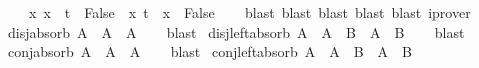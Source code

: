 \begin{isabellebody}
\ \ \ \ {\isachardoublequoteopen}{\isacharparenleft}{\kern0pt}{\isasymforall}x{\isachardot}{\kern0pt}\ x\ {\isasymnoteq}\ t{\isacharparenright}{\kern0pt}\ {\isacharequal}{\kern0pt}\ False{\isachardoublequoteclose}\ \ {\isachardoublequoteopen}{\isacharparenleft}{\kern0pt}{\isasymforall}x{\isachardot}{\kern0pt}\ t\ {\isasymnoteq}\ x{\isacharparenright}{\kern0pt}\ {\isacharequal}{\kern0pt}\ False{\isachardoublequoteclose}\isanewline
%
\isadelimproof
\ \ %
\endisadelimproof
%
\isatagproof
{}\isamarkupfalse%
\ {\isacharparenleft}{\kern0pt}blast{\isacharcomma}{\kern0pt}\ blast{\isacharcomma}{\kern0pt}\ blast{\isacharcomma}{\kern0pt}\ blast{\isacharcomma}{\kern0pt}\ blast{\isacharcomma}{\kern0pt}\ iprover{\isacharplus}{\kern0pt}{\isacharparenright}{\kern0pt}%
\endisatagproof
{\isafoldproof}%
%
\isadelimproof
\isanewline
%
\endisadelimproof
\isanewline
{}\isamarkupfalse%
\ disj{\isacharunderscore}{\kern0pt}absorb{\isacharcolon}{\kern0pt}\ {\isachardoublequoteopen}A\ {\isasymor}\ A\ {\isasymlongleftrightarrow}\ A{\isachardoublequoteclose}\isanewline
%
\isadelimproof
\ \ %
\endisadelimproof
%
\isatagproof
{}\isamarkupfalse%
\ blast%
\endisatagproof
{\isafoldproof}%
%
\isadelimproof
\isanewline
%
\endisadelimproof
\isanewline
{}\isamarkupfalse%
\ disj{\isacharunderscore}{\kern0pt}left{\isacharunderscore}{\kern0pt}absorb{\isacharcolon}{\kern0pt}\ {\isachardoublequoteopen}A\ {\isasymor}\ {\isacharparenleft}{\kern0pt}A\ {\isasymor}\ B{\isacharparenright}{\kern0pt}\ {\isasymlongleftrightarrow}\ A\ {\isasymor}\ B{\isachardoublequoteclose}\isanewline
%
\isadelimproof
\ \ %
\endisadelimproof
%
\isatagproof
{}\isamarkupfalse%
\ blast%
\endisatagproof
{\isafoldproof}%
%
\isadelimproof
\isanewline
%
\endisadelimproof
\isanewline
{}\isamarkupfalse%
\ conj{\isacharunderscore}{\kern0pt}absorb{\isacharcolon}{\kern0pt}\ {\isachardoublequoteopen}A\ {\isasymand}\ A\ {\isasymlongleftrightarrow}\ A{\isachardoublequoteclose}\isanewline
%
\isadelimproof
\ \ %
\endisadelimproof
%
\isatagproof
{}\isamarkupfalse%
\ blast%
\endisatagproof
{\isafoldproof}%
%
\isadelimproof
\isanewline
%
\endisadelimproof
\isanewline
{}\isamarkupfalse%
\ conj{\isacharunderscore}{\kern0pt}left{\isacharunderscore}{\kern0pt}absorb{\isacharcolon}{\kern0pt}\ {\isachardoublequoteopen}A\ {\isasymand}\ {\isacharparenleft}{\kern0pt}A\ {\isasymand}\ B{\isacharparenright}{\kern0pt}\ {\isasymlongleftrightarrow}\ A\ {\isasymand}\ B{\isachardoublequoteclose}\isanewline
%
\isadelimproof
\ \ %
\endisadelimproof

\end{isabellebody}
